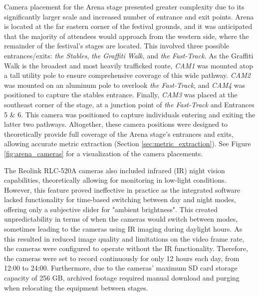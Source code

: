 Camera placement for the Arena stage presented greater complexity due to its significantly larger scale and increased number of entrance and exit points. Arena is located at the far eastern corner of the festival grounds, and it was anticipated that the majority of attendees would approach from the western side, where the remainder of the festival's stages are located. This involved three possible entrances/exits: \textit{the Stables}, \textit{the Graffiti Walk}, and \textit{the Fast-Track}. As the Graffiti Walk is the broadest and most heavily trafficked route, \textit{CAM1} was mounted atop a tall utility pole to ensure comprehensive coverage of this wide pathway. \textit{CAM2} was mounted on an aluminum pole to overlook \textit{the Fast-Track}, and \textit{CAM4} was positioned to capture the stables entrance. Finally, \textit{CAM3} was placed at the southeast corner of the stage, at a junction point of \textit{the Fast-Track} and Entrances 5 \& 6. This camera was positioned to capture individuals entering and exiting the latter two pathways. Altogether, these camera positions were designed to theoretically provide full coverage of the Arena stage's entrances and exits, allowing accurate metric extraction (Section \ref{sec:metric_extraction}). See Figure \ref{fig:arena_cameras} for a visualization of the camera placements.

The Reolink RLC-520A cameras also included infrared (IR) night vision capabilities, theoretically allowing for monitoring in low-light conditions. However, this feature proved ineffective in practice as the integrated software lacked functionality for time-based switching between day and night modes, offering only a subjective slider for "ambient brightness". This created unpredictability in terms of when the cameras would switch between modes, sometimes leading to the cameras using IR imaging during daylight hours. As this resulted in reduced image quality and limitations on the video frame rate, the cameras were configured to operate without the IR functionality. Therefore, the cameras were set to record continuously for only 12 hours each day, from 12:00 to 24:00. Furthermore, due to the cameras' maximum SD card storage capacity of 256 GB, archived footage required manual download and purging when relocating the equipment between stages.

